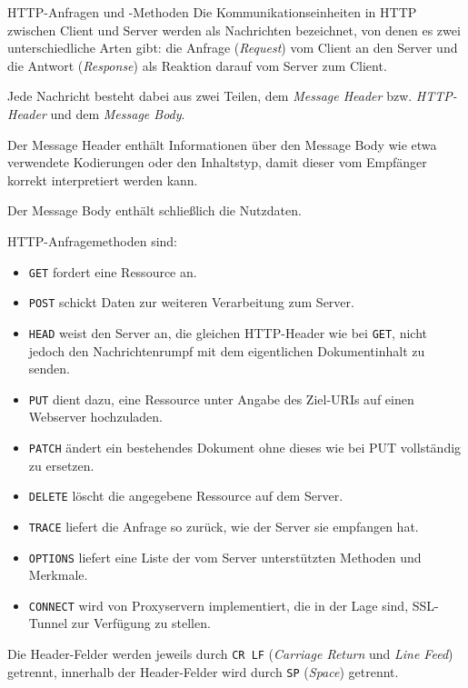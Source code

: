 \begin{defi}{HTTP-Anfragen und -Methoden}
    Die Kommunikationseinheiten in HTTP zwischen Client und Server werden als Nachrichten bezeichnet, von denen es zwei unterschiedliche Arten gibt: die Anfrage (\emph{Request}) vom Client an den Server und die Antwort (\emph{Response}) als Reaktion darauf vom Server zum Client.

    Jede Nachricht besteht dabei aus zwei Teilen, dem \emph{Message Header} bzw. \emph{HTTP-Header} und dem \emph{Message Body}.

    Der Message Header enthält Informationen über den Message Body wie etwa verwendete Kodierungen oder den Inhaltstyp, damit dieser vom Empfänger korrekt interpretiert werden kann.

    Der Message Body enthält schließlich die Nutzdaten.

    HTTP-Anfragemethoden sind:
    \begin{itemize}
        \item \texttt{GET} fordert eine Ressource an.
        \item \texttt{POST} schickt Daten zur weiteren Verarbeitung zum Server.
        \item \texttt{HEAD} weist den Server an, die gleichen HTTP-Header wie bei \texttt{GET}, nicht jedoch den Nachrichtenrumpf mit dem eigentlichen Dokumentinhalt zu senden.
        \item \texttt{PUT} dient dazu, eine Ressource unter Angabe des Ziel-URIs auf einen Webserver hochzuladen.
        \item \texttt{PATCH} ändert ein bestehendes Dokument ohne dieses wie bei PUT vollständig zu ersetzen.
        \item \texttt{DELETE} löscht die angegebene Ressource auf dem Server.
        \item \texttt{TRACE} liefert die Anfrage so zurück, wie der Server sie empfangen hat.
        \item \texttt{OPTIONS} liefert eine Liste der vom Server unterstützten Methoden und Merkmale.
        \item \texttt{CONNECT} wird von Proxyservern implementiert, die in der Lage sind, SSL-Tunnel zur Verfügung zu stellen.
    \end{itemize}

    Die Header-Felder werden jeweils durch \texttt{CR LF} (\emph{Carriage Return} und \emph{Line Feed}) getrennt, innerhalb der Header-Felder wird durch \texttt{SP} (\emph{Space}) getrennt.
\end{defi}

